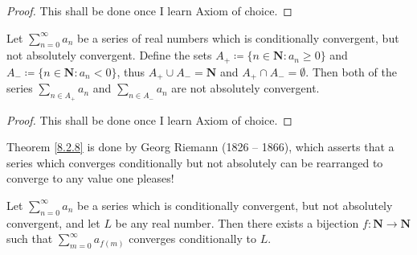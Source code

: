 \begin{proof}
    This shall be done once I learn Axiom of choice.
\end{proof}

\begin{lemma}\label{8.2.7}
    Let \(\sum_{n = 0}^\infty a_n\) be a series of real numbers which is conditionally convergent, but not absolutely convergent.
    Define the sets \(A_+ \coloneqq \{n \in \mathbf{N} : a_n \geq 0\}\) and \(A_- \coloneqq \{n \in \mathbf{N} : a_n < 0\}\), thus \(A_+ \cup A_- = \mathbf{N}\) and \(A_+ \cap A_- = \emptyset\).
    Then both of the series \(\sum_{n \in A_+} a_n\) and \(\sum_{n \in A_-} a_n\) are not absolutely convergent.
\end{lemma}

\begin{proof}
    This shall be done once I learn Axiom of choice.
\end{proof}

\begin{note}
    Theorem \ref{8.2.8} is done by Georg Riemann (1826 -- 1866), which asserts that a series which converges conditionally but not absolutely can be rearranged to converge to any value one pleases!
\end{note}

\begin{theorem}\label{8.2.8}
    Let \(\sum_{n = 0}^\infty a_n\) be a series which is conditionally convergent, but not absolutely convergent, and let \(L\) be any real number.
    Then there exists a bijection \(f : \mathbf{N} \to \mathbf{N}\) such that \(\sum_{m = 0}^\infty a_{f(m)}\) converges conditionally to \(L\).
\end{theorem}

